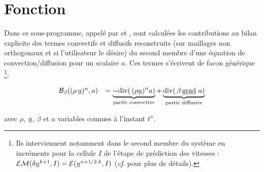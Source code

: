 %
%
%
%
%
%
%
%

\vspace{1cm}
\section{Fonction}

  Dans ce sous-programme, appel\'e par  et , sont calcul\'ees les contributions au bilan explicite des termes
convectifs et diffusifs reconstruits
(sur maillages non orthogonaux et si l'utilisateur le d\'esire) du second membre
d'une \'equation de convection/diffusion pour un scalaire $a$. Ces termes s'\'ecrivent de
facon g\'en\'erique \footnote{Ils interviennent notamment dans le second
membre du syst\`eme en incr\'ements pour la cellule $I$ de l'\'etape de pr\'ediction des vitesses : $\mathcal{EM}(\delta\underline{u}^{k+1},I) =
\mathcal{E}(\underline{u}^{n+1/2,k},I)$  ({\it cf}.  pour plus de d\'etails).}:

\begin{equation}\label{Base_Bilsc2_eq_continue}
\begin{array}{ll}
\mathcal{B_{\mathcal{\beta}}}((\rho\,\underline{u})^{n},a)
&=\underbrace{-\text{div}(\,(\rho \underline{u})^{n}a)}_{\text {partie convective}}
+\underbrace{\text{div}(\,\beta\,\text{g}\underline{\text{rad}}\  a)}_{\text{partie diffusive}}\\
\end{array}
\end{equation}

avec $\rho$, $\underline{u}$, $\beta$ et $a$ variables connues \`a l'instant ${t^n}$.

